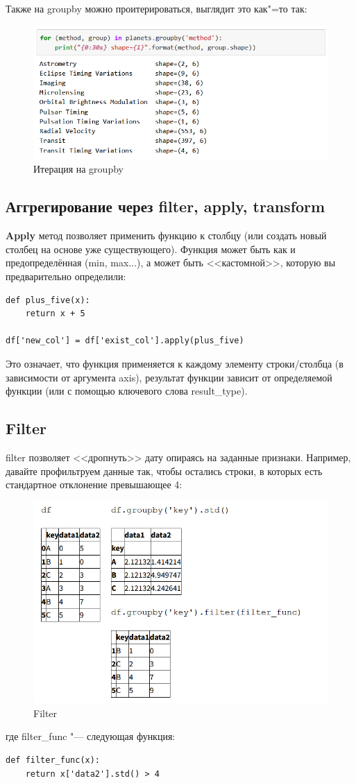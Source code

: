 \documentclass{article}
\begin{document}
Также на groupby можно проитерироваться, выглядит это как"=то так:
\begin{figure}[H]
    \centering
    \includegraphics[width=0.7\linewidth]{groupby_iteration.png}
    \caption{Итерация на groupby}
    \label{fig:enter-label}
\end{figure}

\subsection*{Аггрегирование через filter, apply, transform}
\textbf{Apply} метод позволяет применить функцию к столбцу (или создать новый столбец на основе уже существующего). Функция может быть как и предопределённая (min, max...), а может быть <<кастомной>>, которую вы предварительно определили:
\begin{verbatim}
def plus_five(x):
    return x + 5

df['new_col'] = df['exist_col'].apply(plus_five)
\end{verbatim}
Это означает, что функция применяется к каждому элементу строки/столбца (в зависимости от аргумента axis), результат функции зависит от определяемой функции (или с помощью ключевого слова result\_type).

\subsection*{Filter}
filter позволяет <<дропнуть>> дату опираясь на заданные признаки. Например, давайте профильтруем данные так, чтобы остались строки, в которых есть стандартное отклонение превышающее 4:
\begin{figure}[H]
    \centering
    \includegraphics[width=0.75\linewidth]{filter.png}
    \caption{Filter}
    \label{fig:enter-label}
\end{figure}
где filter\_func "--- следующая функция:
\begin{verbatim}
def filter_func(x):
    return x['data2'].std() > 4
\end{verbatim}
\end{document}
